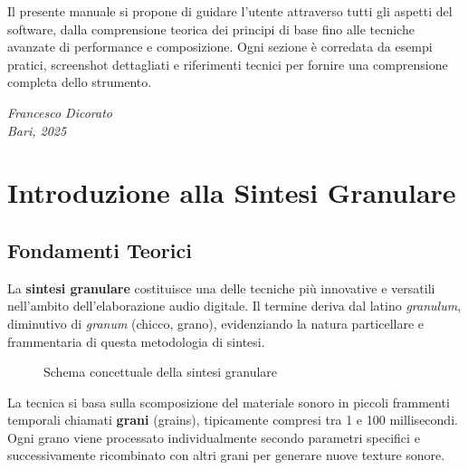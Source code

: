 \documentclass[a4paper,11pt,openany]{book}
\begin{document}
Il presente manuale si propone di guidare l'utente attraverso tutti gli aspetti del software, dalla comprensione teorica dei principi di base fino alle tecniche avanzate di performance e composizione. Ogni sezione è corredata da esempi pratici, screenshot dettagliati e riferimenti tecnici per fornire una comprensione completa dello strumento.


\vspace{1cm}

\textit{Francesco Dicorato}\\
\textit{Bari, 2025}

\chapter{Introduzione alla Sintesi Granulare}

\section{Fondamenti Teorici}

La \textbf{sintesi granulare} costituisce una delle tecniche più innovative e versatili nell'ambito dell'elaborazione audio digitale. Il termine deriva dal latino \textit{granulum}, diminutivo di \textit{granum} (chicco, grano), evidenziando la natura particellare e frammentaria di questa metodologia di sintesi.

\begin{figure}[H]
    \centering
    \caption{Schema concettuale della sintesi granulare}
    \label{fig:granular_concept}
\end{figure}

La tecnica si basa sulla scomposizione del materiale sonoro in piccoli frammenti temporali chiamati \textbf{grani} (grains), tipicamente compresi tra 1 e 100 millisecondi. Ogni grano viene processato individualmente secondo parametri specifici e successivamente ricombinato con altri grani per generare nuove texture sonore.
\end{document}
